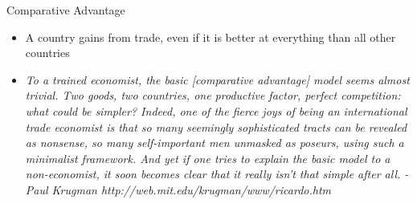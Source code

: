 \documentclass[ignorenonframetext,]{beamer}
\begin{document}
\begin{frame}


\end{frame}

\begin{frame}{Comparative Advantage}

    \begin{itemize}
        \item A country gains from trade, even if it is better at everything than all other countries
        \item {\footnotesize\emph{To a trained economist, the basic [comparative advantage] model seems almost trivial. Two goods, two countries, one productive factor, perfect competition: what could be simpler? Indeed, one of the fierce joys of being an international trade economist is that so many seemingly sophisticated tracts can be revealed as nonsense, so many self-important men unmasked as poseurs, using such a minimalist framework. And yet if one tries to explain the basic model to a non-economist, it soon becomes clear that it really isn't that simple after all. -Paul Krugman http://web.mit.edu/krugman/www/ricardo.htm}}
    \end{itemize}

\end{frame}
\end{document}
